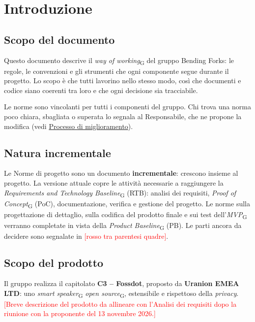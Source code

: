 \documentclass[12pt,a4paper]{article}
\newcommand{\ph}[1]{\textcolor{red}{[#1]}}
\newcommand{\gl}[1]{\emph{#1}\textsubscript{\scriptsize G}}
\begin{document}
\section{Introduzione}

\subsection{Scopo del documento}
Questo documento descrive il \gl{way of working} del gruppo Bending Forks: le regole, le convenzioni e gli strumenti che ogni componente segue durante il progetto. Lo scopo è che tutti lavorino nello stesso modo, così che documenti e codice siano coerenti tra loro e che ogni decisione sia tracciabile.

Le norme sono vincolanti per tutti i componenti del gruppo. Chi trova una norma poco chiara, sbagliata o superata lo segnala al Responsabile, che ne propone la modifica (vedi \hyperref[sec:miglioramento]{Processo di miglioramento}).

\subsection{Natura incrementale}
Le Norme di progetto sono un documento \textbf{incrementale}: crescono insieme al progetto. La versione attuale copre le attività necessarie a raggiungere la \gl{Requirements and Technology Baseline} (RTB): analisi dei requisiti, \gl{Proof of Concept} (PoC), documentazione, verifica e gestione del progetto. Le norme sulla progettazione di dettaglio, sulla codifica del prodotto finale e sui test dell'\gl{MVP} verranno completate in vista della \gl{Product Baseline} (PB). Le parti ancora da decidere sono segnalate in \ph{rosso tra parentesi quadre}.

\subsection{Scopo del prodotto}
Il gruppo realizza il capitolato \textbf{C3 -- Fossdot}, proposto da \textbf{Uranion EMEA LTD}: uno \gl{smart speaker} \gl{open source}, estensibile e rispettoso della \emph{privacy}. \ph{Breve descrizione del prodotto da allineare con l'Analisi dei requisiti dopo la riunione con la proponente del 13 novembre 2026.}
\end{document}
